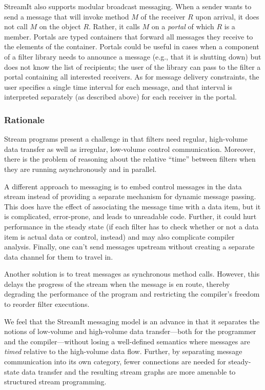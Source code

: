 \documentclass[final]{ijpp}
\begin{document}
StreamIt  also supports  modular broadcast  messaging.  When  a sender
wants to  send a message that  will invoke method $M$  of the receiver
$R$ upon arrival, it does not  call $M$ on the object $R$.  Rather, it
calls $M$  on a \emph{portal} of  which $R$ is a  member.  Portals are
typed  containers  that  forward  all  messages they  receive  to  the
elements of  the container.  Portals could  be useful in  cases when a
component of a filter library  needs to announce a message (e.g., that
it is  shutting down) but  does not know  the list of  recipients; the
user of  the library can  pass to the  filter a portal  containing all
interested receivers.   As for message delivery  constraints, the user
specifies a single  time interval for each message,  and that interval
is interpreted  separately (as described  above) for each  receiver in
the portal.

\subsubsection{Rationale}
Stream  programs present  a challenge  in that  filters  need regular,
high-volume  data transfer  as well  as irregular,  low-volume control
communication.  Moreover, there is  the problem of reasoning about the
relative ``time'' between filters when they are running asynchronously
and in parallel.

A different approach to messaging  is to embed control messages in the
data  stream instead  of providing  a separate  mechanism  for dynamic
message passing.  This does have the effect of associating the message
time with a  data item, but it is  complicated, error-prone, and leads
to unreadable code.  Further, it  could hurt performance in the steady
state  (if each filter  has to  check whether  or not  a data  item is
actual  data or  control, instead)  and may  also  complicate compiler
analysis.  Finally, one can't  send messages upstream without creating
a separate data channel for them to travel in.

Another  solution is to  treat messages  as synchronous  method calls.
However, this delays the progress of the stream when the message is en
route,  thereby   degrading  the   performance  of  the   program  and
restricting the compiler's freedom to reorder filter executions.

We feel  that the StreamIt  messaging model is  an advance in  that it
separates   the   notions   of   low-volume   and   high-volume   data
transfer---both for the programmer and the compiler---without losing a
well-defined semantics where messages are \emph{timed} relative to the
high-volume data  flow.  Further, by  separating message communication
into its  own category, fewer connections are  needed for steady-state
data transfer  and the  resulting stream graphs  are more  amenable to
structured stream programming.
\end{document}
